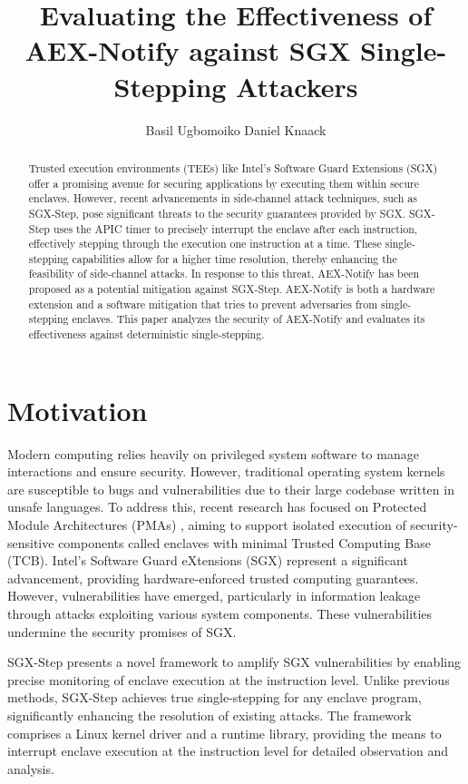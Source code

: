 \documentclass{llncs}
\title{Evaluating the Effectiveness of AEX-Notify against SGX Single-Stepping Attackers}
\author{Basil Ugbomoiko \quad Daniel Knaack}
\institute{	University of L\"ubeck, Germany\\
	\email{\{basil.ugbomoiko,daniel.knaack\}@student.uni-luebeck.de}}
\begin{document}
\maketitle

\begin{abstract}
  Trusted execution environments (TEEs) like Intel's Software Guard Extensions
  (SGX) offer a promising avenue for securing applications by executing them
  within secure enclaves.
  However, recent advancements in side-channel attack techniques, such as
  SGX-Step, pose significant threats to the security guarantees provided by
  SGX.
  SGX-Step uses the APIC timer to precisely interrupt the enclave after each
  instruction, effectively stepping through the execution one instruction at a
  time.
  These single-stepping capabilities allow for a higher time resolution,
  thereby enhancing the feasibility of side-channel attacks.
  In response to this threat, AEX-Notify has been proposed as a potential
  mitigation against SGX-Step. AEX-Notify is both a hardware extension and a
  software mitigation that tries to prevent adversaries from single-stepping
  enclaves.
  This paper analyzes the security of AEX-Notify and evaluates its
  effectiveness against deterministic single-stepping.
\end{abstract}

\section{Motivation}

Modern computing relies heavily on privileged system software to manage
interactions and ensure security.
However, traditional operating system kernels are susceptible to bugs and
vulnerabilities due to their large codebase written in unsafe languages.
To address this, recent research has focused on Protected Module Architectures
(PMAs) \cite{MaeneGCMFV18,CostanLD16,Intel17}, aiming to support isolated
execution of security-sensitive components called enclaves with minimal Trusted
Computing Base (TCB).
Intel’s Software Guard eXtensions (SGX) \cite{Intel16,Intel17} represent a
significant advancement, providing hardware-enforced trusted computing
guarantees.
However, vulnerabilities have emerged, particularly in information leakage
through attacks exploiting various system components.
These vulnerabilities undermine the security promises of SGX.

SGX-Step \cite{BulckPS17} presents a novel framework to amplify SGX
vulnerabilities by enabling precise monitoring of enclave execution at the
instruction level.
Unlike previous methods, SGX-Step achieves true single-stepping for any enclave
program, significantly enhancing the resolution of existing attacks.
The framework comprises a Linux kernel driver and a runtime library, providing
the means to interrupt enclave execution at the instruction level for detailed
observation and analysis.
\end{document}
